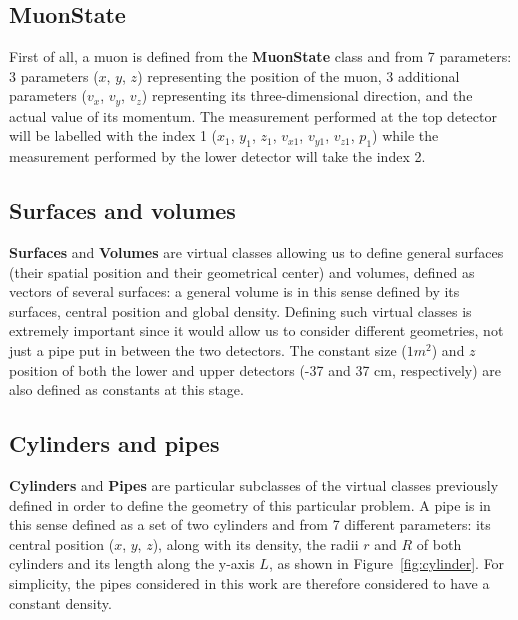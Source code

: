 \documentclass[a4paper, 11pt]{report}
\begin{document}
\subsection{MuonState}

First of all, a muon is defined from the \textbf{MuonState} class and from 7 parameters: 3 parameters ($x$, $y$, $z$) representing the position of the muon, 3 additional parameters ($v_x$, $v_y$, $v_z$) representing its three-dimensional direction, and the actual value of its momentum. The measurement performed at the top detector will be labelled with the index 1 ($x_1$, $y_1$, $z_1$, $v_{x1}$, $v_{y1}$, $v_{z1}$, $p_1$) while the measurement performed by the lower detector will take the index 2.

\subsection{Surfaces and volumes}

\textbf{Surfaces} and \textbf{Volumes} are virtual classes allowing us to define general surfaces (their spatial position and their geometrical center) and volumes, defined as vectors of several surfaces: a general volume is in this sense defined by its surfaces, central position and global density. Defining such virtual classes is extremely important since it would allow us to consider different geometries, not just a pipe put in between the two detectors. The constant size ($1 m^2$) and $z$ position of both the lower and upper detectors (-37 and 37 cm, respectively) are also defined as constants at this stage.

\subsection{Cylinders and pipes}

\textbf{Cylinders} and \textbf{Pipes} are particular subclasses of the virtual classes previously defined in order to define the geometry of this particular problem. A pipe is in this sense defined as a set of two cylinders and from 7 different parameters: its central position ($x$, $y$, $z$), along with its density, the radii $r$ and $R$ of both cylinders and its length along the y-axis $L$, as shown in Figure~\ref{fig:cylinder}. For simplicity, the pipes considered in this work are therefore considered to have a constant density.
\end{document}
